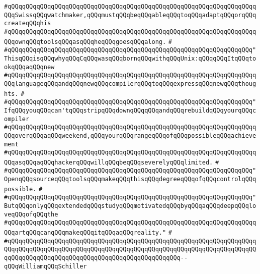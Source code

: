 \verb|#qQQqqQQqqQQqqQQqqQQqqQQqqQQqqQQqqQQqqQQqqQQqqQQqqQQqqQQqqQQqqQQqqQQqqQQqSwissqQQqwatchmaker,qQQqmustqQQqbeqQQqableqQQqtoqQQqadaptqQQqorqQQqcreateqQQqhis|\newline
\verb|#qQQqqQQqqQQqqQQqqQQqqQQqqQQqqQQqqQQqqQQqqQQqqQQqqQQqqQQqqQQqqQQqqQQqqQQqownqQQqtoolsqQQqasqQQqheqQQqgoesqQQqalong.|\newline
\verb|#|\newline
\verb|#qQQqqQQqqQQqqQQqqQQqqQQqqQQqqQQqqQQqqQQqqQQqqQQqqQQqqQQqqQQqqQQqqQQq"ThisqQQqisqQQqwhyqQQqCqQQqwasqQQqbornqQQqwithqQQqUnix:qQQqqQQqItqQQqtookqQQqaqQQqnew|\newline
\verb|#qQQqqQQqqQQqqQQqqQQqqQQqqQQqqQQqqQQqqQQqqQQqqQQqqQQqqQQqqQQqqQQqqQQqqQQqlanguageqQQqandqQQqnewqQQqcompilerqQQqtoqQQqexpressqQQqnewqQQqthoughts.|\newline
\verb|#|\newline
\verb|#qQQqqQQqqQQqqQQqqQQqqQQqqQQqqQQqqQQqqQQqqQQqqQQqqQQqqQQqqQQqqQQqqQQq"IfqQQqyouqQQqcan'tqQQqstripqQQqdownqQQqqQQqandqQQqrebuildqQQqyourqQQqcompiler|\newline
\verb|#qQQqqQQqqQQqqQQqqQQqqQQqqQQqqQQqqQQqqQQqqQQqqQQqqQQqqQQqqQQqqQQqqQQqqQQqoverqQQqaqQQqweekend,qQQqyourqQQqrangeqQQqofqQQqpossibleqQQqachievement|\newline
\verb|#qQQqqQQqqQQqqQQqqQQqqQQqqQQqqQQqqQQqqQQqqQQqqQQqqQQqqQQqqQQqqQQqqQQqqQQqasqQQqaqQQqhackerqQQqwillqQQqbeqQQqseverelyqQQqlimited.|\newline
\verb|#|\newline
\verb|#qQQqqQQqqQQqqQQqqQQqqQQqqQQqqQQqqQQqqQQqqQQqqQQqqQQqqQQqqQQqqQQqqQQq"OpenqQQqsourceqQQqtoolsqQQqmakeqQQqthisqQQqdegreeqQQqofqQQqcontrolqQQqpossible.|\newline
\verb|#|\newline
\verb|#qQQqqQQqqQQqqQQqqQQqqQQqqQQqqQQqqQQqqQQqqQQqqQQqqQQqqQQqqQQqqQQqqQQq"ButqQQqonlyqQQqextendedqQQqstudyqQQqmotivatedqQQqbyqQQqaqQQqdeepqQQqloveqQQqofqQQqthe|\newline
\verb|#qQQqqQQqqQQqqQQqqQQqqQQqqQQqqQQqqQQqqQQqqQQqqQQqqQQqqQQqqQQqqQQqqQQqqQQqartqQQqcanqQQqmakeqQQqitqQQqaqQQqreality."|\newline
\verb|#|\newline
\verb|#qQQqqQQqqQQqqQQqqQQqqQQqqQQqqQQqqQQqqQQqqQQqqQQqqQQqqQQqqQQqqQQqqQQqqQQqqQQqqQQqqQQqqQQqqQQqqQQqqQQqqQQqqQQqqQQqqQQqqQQqqQQqqQQqqQQqqQQqqQQqqQQqqQQqqQQqqQQqqQQqqQQqqQQqqQQqqQQqqQQqqQQqqQQq--qQQqWilliamqQQqSchiller|\newline
\newline
\newline
